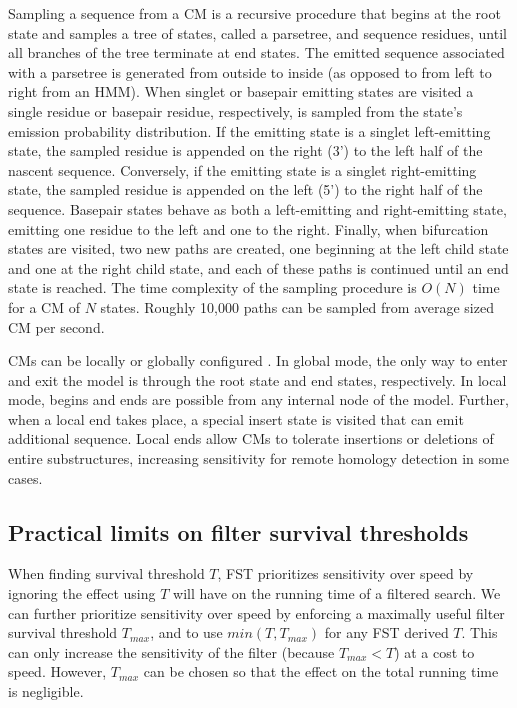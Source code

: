 Sampling a sequence from a CM is a recursive procedure that begins at
the root state and samples a tree of states, called a parsetree, and
sequence residues, until all branches of the tree terminate at end
states. The emitted sequence associated with a parsetree is generated
from outside to inside (as opposed to from left to right from an
HMM). When singlet or basepair emitting states are visited a single
residue or basepair residue, respectively, is sampled from the state's
emission probability distribution. If the emitting state is a singlet
left-emitting state, the sampled residue is appended on the right (3')
to the left half of the nascent sequence. Conversely, if the emitting
state is a singlet right-emitting state, the sampled residue is
appended on the left (5') to the right half of the sequence. Basepair
states behave as both a left-emitting and right-emitting state,
emitting one residue to the left and one to the right. Finally, when
bifurcation states are visited, two new paths are created, one
beginning at the left child state and one at the right child state,
and each of these paths is continued until an end state is reached.
The time complexity of the sampling procedure is $O(N)$ time for a CM
of $N$ states. Roughly 10,000 paths can be sampled from average sized
CM per second.

CMs can be locally or globally configured
\citep{KleinEddy03,infguide03}. In global mode, the only way to enter
and exit the model is through the root state and end states,
respectively.  In local mode, begins and ends are possible from any
internal node of the model. Further, when a local end takes place, a
special insert state is visited that can emit additional
sequence. Local ends allow CMs to tolerate insertions or deletions of
entire substructures, increasing sensitivity for remote homology
detection in some cases.

\subsection{Practical limits on filter survival thresholds}

When finding survival threshold $T$, %
FST prioritizes sensitivity over speed by ignoring the
effect using $T$ will have on the running time of a filtered search. 
We can further prioritize sensitivity over speed by enforcing a
maximally useful filter survival threshold $T_{max}$, and to use
$min(T, T_{max})$ for any FST derived $T$. This can only increase the
sensitivity of the filter (because $T_{max} < T$) at a cost to
speed. However, $T_{max}$ can be chosen so that the effect on the total
running time is negligible.%

